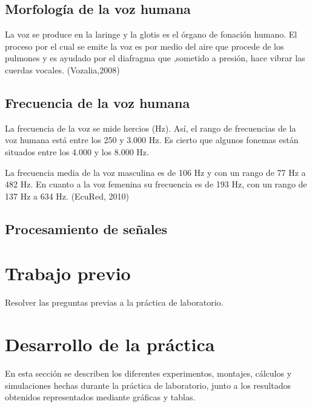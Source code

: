 \documentclass[journal]{IEEEtran}
\begin{document}
\subsection{\textbf{Morfología de la voz humana}}
La voz se produce en la laringe y la glotis es el órgano de fonación humano. El proceso por el cual se emite la voz es por medio del aire que procede de los pulmones y es ayudado por el diafragma que ,sometido a presión, hace vibrar las cuerdas vocales. (Vozalia,2008)
\subsection{\textbf{Frecuencia de la voz humana}}
La frecuencia de la voz se mide hercios (Hz). Así, el rango de frecuencias de la voz humana está entre los 250 y 3.000 Hz. Es cierto que algunos fonemas están situados entre los 4.000 y los 8.000 Hz.

La frecuencia media de la voz masculina es de 106 Hz y con un rango de 77 Hz a 482 Hz. En cuanto a la voz femenina su frecuencia es de 193 Hz, con un rango de 137 Hz a 634 Hz. (EcuRed, 2010)

\subsection{\textbf{Procesamiento de señales}}




\section{Trabajo previo}
Resolver las preguntas previas a la práctica de laboratorio.

\section{Desarrollo de la práctica}
En esta sección se describen los diferentes experimentos, montajes, cálculos y simulaciones hechas durante la práctica de laboratorio, junto a los resultados obtenidos representados mediante gráficas y tablas.
\end{document}
